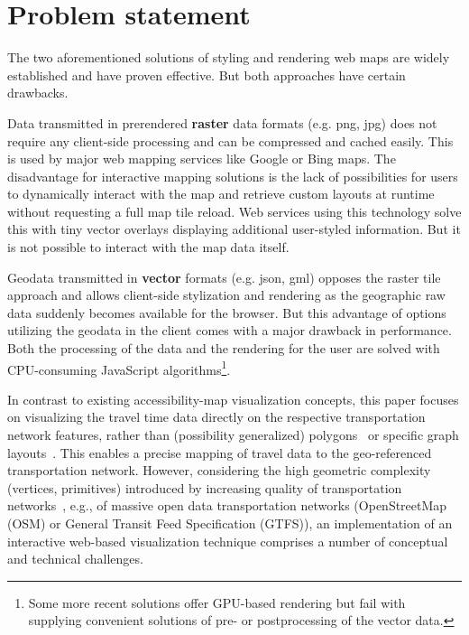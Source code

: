   \section{Problem statement}
    \label{sec:intro:probl}
    The two aforementioned solutions of styling and rendering web maps are widely established and have proven effective. But both approaches have certain drawbacks.\par
    Data transmitted in prerendered \textbf{raster} data formats (e.g. png, jpg) does not require any client-side processing and can be compressed and cached easily. This is used by major web mapping services like Google or Bing maps. The disadvantage for interactive mapping solutions is the lack of possibilities for users to dynamically interact with the map and retrieve custom layouts at runtime without requesting a full map tile reload. Web services using this technology solve this with tiny vector overlays displaying additional user-styled information. But it is not possible to interact with the map data itself.\par
    Geodata transmitted in \textbf{vector} formats (e.g. json, gml) opposes the raster tile approach and allows client-side stylization and rendering as the geographic raw data suddenly becomes available for the browser. But this advantage of options utilizing the geodata in the client comes with a major drawback in performance. Both the processing of the data and the rendering for the user are solved with CPU-consuming JavaScript algorithms\footnote{Some more recent solutions offer GPU-based rendering but fail with supplying convenient solutions of pre- or postprocessing of the vector data.}.\par

    In contrast to existing accessibility-map visualization concepts, this paper focuses
    on visualizing the travel time data directly on the respective transportation network
    features, rather than (possibility generalized) polygons~\cite{Glander2010} or
    specific graph layouts~\cite{Krause2012}. This enables a precise mapping of travel
    data to the geo-referenced transportation network. However, considering the high
    geometric complexity (vertices, primitives) introduced by increasing quality of
    transportation networks~\cite{Zielstra2010}, e.g., of massive open data transportation
    networks (OpenStreetMap (OSM) or General Transit Feed Specification (GTFS)), an
    implementation of an interactive web-based visualization technique comprises a
    number of conceptual and technical challenges.

